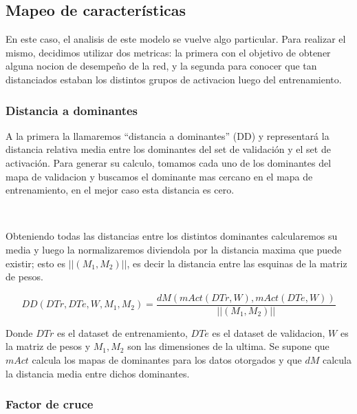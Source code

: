 \documentclass[informe.tex]{subfiles}
\begin{document}
	\restoregeometry
      
      
      
    \subsection{Mapeo de características}
    
      En este caso, el analisis de este modelo se vuelve algo particular. Para realizar el mismo, decidimos utilizar dos metricas: la primera con el objetivo de obtener alguna nocion de desempe\~no de la red, y la segunda para conocer que tan distanciados estaban los distintos grupos de activacion luego del entrenamiento.
      
      
      \subsubsection{Distancia a dominantes}
      
      A la primera la llamaremos ``distancia a dominantes'' (DD) y representar\'a la distancia relativa media entre los dominantes del set de validaci\'on y el set de activaci\'on. Para generar su calculo, tomamos cada uno de los dominantes del mapa de validacion y buscamos el dominante mas cercano en el mapa de entrenamiento, en el mejor caso esta distancia es cero. 
      
      ~
      
      Obteniendo todas las distancias entre los distintos dominantes calcularemos su media y luego la normalizaremos diviendola por la distancia maxima que puede existir; esto es $||(M_1,M_2)||$, es decir la distancia entre las esquinas de la matriz de pesos.
      
      $$DD(DTr, DTe, W, M_1, M_2) = \frac{dM(mAct(DTr,W), mAct(DTe,W))}{||(M_1,M_2)||}$$
      
      Donde $DTr$ es el dataset de entrenamiento, $DTe$ es el dataset de validacion, $W$ es la matriz de pesos y $M_1, M_2$  son las dimensiones de la ultima. Se supone que $mAct$ calcula los mapas de dominantes para los datos otorgados y que $dM$ calcula la distancia media entre dichos dominantes.
      
      \subsubsection{Factor de cruce}
      
\end{document}
